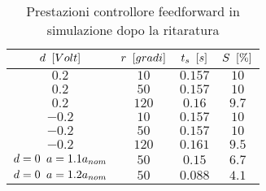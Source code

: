 		\begin{table}[H]
			\centering
			\begin{tabular}{cccc}
				\toprule
				\textbf{$d \singleSpacing [Volt]$} & \textbf{$r \singleSpacing [gradi]$} & \textbf{$t_s \singleSpacing [s]$} & \textbf{$S \singleSpacing [\%]$}\\
				\midrule
				$0.2$   & $10$  & $0.157$ & $10$    \\
				$0.2$   & $50$  & $0.157$ & $10$    \\
				$0.2$   & $120$ & $0.16$  & $9.7$   \\
				$-0.2$  & $10$  & $0.157$ & $10$    \\
				$-0.2$  & $50$  & $0.157$ & $10$    \\ 	
				$-0.2$  & $120$ & $0.161$ & $9.5$   \\ 
				$d=0 \singleSpacing a=1.1a_{nom}$ & $50$ & $0.15$  & $6.7$ \\
				$d=0 \singleSpacing a=1.2a_{nom}$ & $50$ & $0.088$ & $4.1$ \\
				\bottomrule
			\end{tabular}
			\caption{Prestazioni controllore feedforward in simulazione dopo la ritaratura}
			\label{tab:FFsim}
		\end{table}